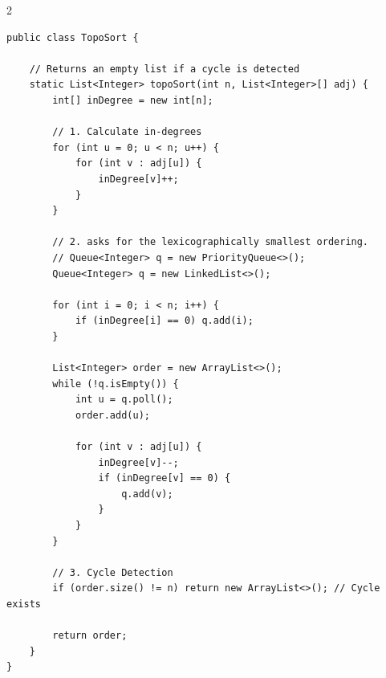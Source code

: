 \documentclass[10pt]{article}
\begin{document}
\begin{multicols}{2}
\begin{framed}
\begin{verbatim}
public class TopoSort {

    // Returns an empty list if a cycle is detected
    static List<Integer> topoSort(int n, List<Integer>[] adj) {
        int[] inDegree = new int[n];

        // 1. Calculate in-degrees
        for (int u = 0; u < n; u++) {
            for (int v : adj[u]) {
                inDegree[v]++;
            }
        }

        // 2. asks for the lexicographically smallest ordering.
        // Queue<Integer> q = new PriorityQueue<>();
        Queue<Integer> q = new LinkedList<>();

        for (int i = 0; i < n; i++) {
            if (inDegree[i] == 0) q.add(i);
        }

        List<Integer> order = new ArrayList<>();
        while (!q.isEmpty()) {
            int u = q.poll();
            order.add(u);

            for (int v : adj[u]) {
                inDegree[v]--;
                if (inDegree[v] == 0) {
                    q.add(v);
                }
            }
        }

        // 3. Cycle Detection
        if (order.size() != n) return new ArrayList<>(); // Cycle exists

        return order;
    }
}
\end{verbatim}
\end{framed}

\end{multicols}
\newpage
\end{document}
